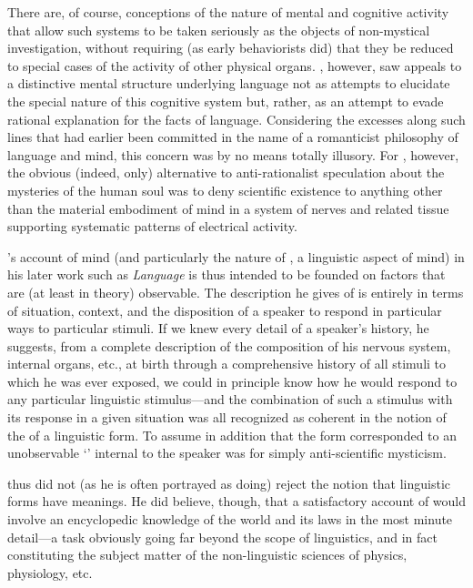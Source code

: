 There are, of course, conceptions of the nature of mental and
cognitive activity that allow such systems to be taken seriously as
the objects of non-mystical investigation, without requiring (as early
behaviorists did) that they be reduced to special cases of the
activity of other physical organs. {\Bloomfield}, however, saw appeals to
a distinctive mental structure underlying language not as attempts to
elucidate the special nature of this cognitive system but, rather, as
an attempt to evade rational {explanation} for the facts of
language. Considering the excesses along such lines that had earlier
been committed in the name of a romanticist philosophy of language and
mind, this concern was by no means totally illusory. For {\Bloomfield},
however, the obvious (indeed, only) alternative to anti-rationalist
speculation about the mysteries of the human soul was to deny
scientific existence to anything other than the material embodiment of
mind in a system of nerves and related tissue supporting systematic
patterns of electrical activity.

{\Bloomfield}'s account of mind (and particularly the nature of ,
a linguistic aspect of mind) in his later work such as
\textsl{Language} is thus intended to be founded on factors that are
(at least in theory) observable. The description he gives of 
is entirely in terms of situation, context, and the disposition of a
speaker to respond in particular ways to particular stimuli. If we
knew every detail of a speaker's history, he suggests, from a complete
description of the composition of his nervous system, internal organs,
etc., at birth through a comprehensive history of all stimuli to which
he was ever exposed, we could in principle know how he would respond
to any particular linguistic stimulus—and the combination of such a
stimulus with its response in a given situation was all {\Bloomfield}
recognized as coherent in the notion of the  of a linguistic
form. To assume in addition that the form corresponded to an
unobservable `' internal to the speaker was for {\Bloomfield}
simply anti-scientific mysticism.

{\Bloomfield} thus did not (as he is often portrayed as doing) reject the
notion that linguistic forms have meanings. He did believe, though,
that a satisfactory account of  would involve an encyclopedic
knowledge of the world and its laws in the most minute detail—a task
obviously going far beyond the scope of linguistics, and in fact
constituting the subject matter of the non-linguistic sciences of
physics, physiology, etc.

